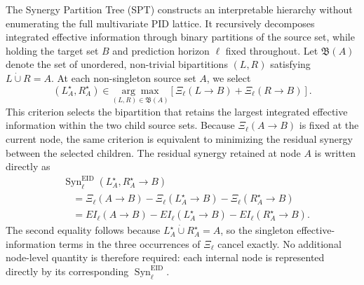 \documentclass[fleqn,10pt]{wlscirep}
\theoremstyle{naturetheorem}
\begin{document}
The Synergy Partition Tree (SPT) constructs an interpretable hierarchy without enumerating the full multivariate PID lattice. It recursively decomposes integrated effective information through binary partitions of the source set, while holding the target set \(B\) and prediction horizon \(\ell\) fixed throughout.  Let
\(\mathfrak{B}(A)\) denote the set of unordered, non-trivial bipartitions
\((L,R)\) satisfying \(L\mathbin{\dot{\cup}}R=A\). At each non-singleton
source set \(A\), we select
\begin{equation}
    \left(
        L_A^{\star},R_A^{\star}
    \right)
    \in
    \underset{(L,R)\in\mathfrak{B}(A)}{\arg\max}
    \left[
        \Xi_{\ell}(L\rightarrow B)
        +
        \Xi_{\ell}(R\rightarrow B)
    \right].
    \label{eq:greedy_split}
\end{equation}
This criterion selects the bipartition that retains the largest integrated
effective information within the two child source sets. Because
\(\Xi_{\ell}(A\rightarrow B)\) is fixed at the current node, the same criterion
is equivalent to minimizing the residual synergy between the selected
children. The residual synergy retained at node \(A\) is written directly as
\begin{align}
    &\operatorname{Syn}^{\mathrm{EID}}_{\ell}
    \left(
        L_A^{\star},R_A^{\star}\rightarrow B
    \right)
    \nonumber\\
    &\quad=
    \Xi_{\ell}(A\rightarrow B)
    -
    \Xi_{\ell}(L_A^{\star}\rightarrow B)
    -
    \Xi_{\ell}(R_A^{\star}\rightarrow B)
    \nonumber\\
    &\quad=
    EI_{\ell}(A\rightarrow B)
    -
    EI_{\ell}(L_A^{\star}\rightarrow B)
    -
    EI_{\ell}(R_A^{\star}\rightarrow B).
    \label{eq:greedy_node_synergy}
\end{align}
The second equality follows because
\(L_A^{\star}\mathbin{\dot{\cup}}R_A^{\star}=A\), so the singleton
effective-information terms in the three occurrences of \(\Xi_{\ell}\)
cancel exactly. No additional node-level quantity is therefore required:
each internal node is represented directly by its corresponding
\(\operatorname{Syn}^{\mathrm{EID}}_{\ell}\).
\end{document}
